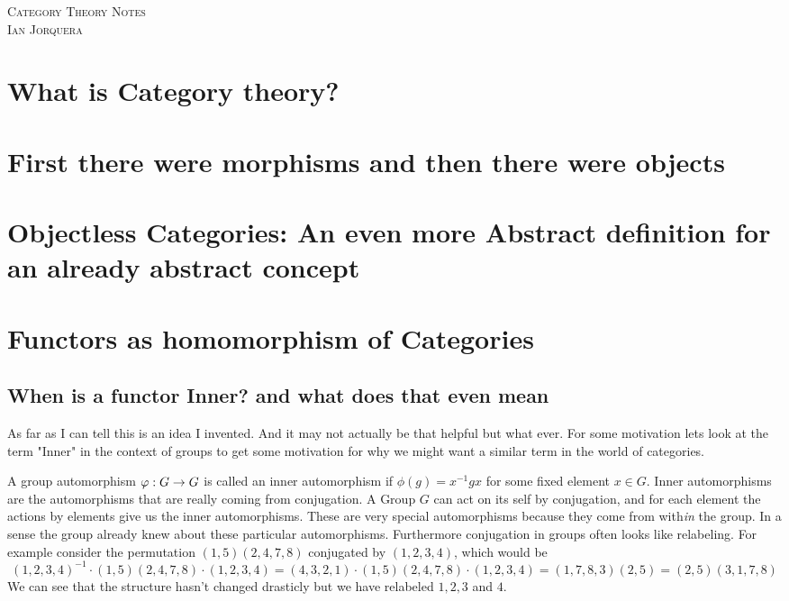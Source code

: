 \documentclass[12pt]{amsart}
\begin{document}
\begin{center}
    \textsc{Category Theory Notes\\ Ian Jorquera}
\end{center}
\vspace{1em}
\section{What is Category theory?}

\section{First there were morphisms and then there were objects}


\section{Objectless Categories: An even more Abstract definition for an already abstract concept}

\section{Functors as homomorphism of Categories}

\subsection{When is a functor Inner? and what does that even mean}
As far as I can tell this is an idea I invented. And it may not actually be that helpful but what ever. 
For some motivation lets look at the term "Inner"
in the context of groups to get some motivation for why we might want a similar term in 
the world of categories. 

A group automorphism $\varphi:G\rightarrow G$ is called an inner automorphism if $\phi(g)=x^{-1}gx$ for 
some fixed element $x\in G$. Inner automorphisms are the automorphisms that are really coming 
from conjugation. A Group $G$ can act on its self by conjugation, and for each element the actions 
by elements give us the inner automorphisms. These are very special automorphisms because they come 
from with\textit{in} the group. In a sense the group already knew about these particular automorphisms.
Furthermore conjugation in groups often looks like relabeling. For example consider the permutation $(1,5)(2,4,7,8)$
conjugated by $(1,2,3,4)$, which would be 
\[(1,2,3,4)^{-1}\cdot(1,5)(2,4,7,8)\cdot(1,2,3,4)=(4,3,2,1)\cdot(1,5)(2,4,7,8)\cdot(1,2,3,4)=(1,7,8,3)(2,5)=(2,5)(3,1,7,8)\]
We can see that the structure hasn't changed drasticly but we have relabeled $1,2,3$ and $4$.
\end{document}
